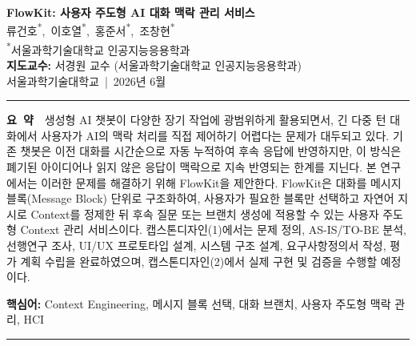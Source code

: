 \documentclass[10pt, a4paper]{article}
\begin{document}
\begin{center}
  {\large\bfseries FlowKit: 사용자 주도형 AI 대화 맥락 관리 서비스}\\[10pt]

  {\normalsize
    류건호\textsuperscript{*},\ 이호열\textsuperscript{*},\ 홍준서\textsuperscript{*},\ 조창현\textsuperscript{*}
  }\\[4pt]

  {\small
    \textsuperscript{*}서울과학기술대학교 인공지능응용학과\\[4pt]
    \textbf{지도교수:} 서경원 교수 (서울과학기술대학교 인공지능응용학과)\\[2pt]
    서울과학기술대학교\ |\ 2026년 6월
  }
\end{center}

\vspace{4pt}\hrule\vspace{6pt}

\noindent\textbf{요\ 약}\ \ 생성형 AI 챗봇이 다양한 장기 작업에 광범위하게 활용되면서, 긴 다중 턴 대화에서 사용자가
AI의 맥락 처리를 직접 제어하기 어렵다는 문제가 대두되고 있다. 기존 챗봇은 이전 대화를 시간순으로 자동 누적하여
후속 응답에 반영하지만, 이 방식은 폐기된 아이디어나 읽지 않은 응답이 맥락으로 지속 반영되는 한계를 지닌다. 본
연구에서는 이러한 문제를 해결하기 위해 FlowKit을 제안한다. FlowKit은 대화를 메시지 블록(Message Block) 단위로
구조화하여, 사용자가 필요한 블록만 선택하고 자연어 지시로 Context를 정제한 뒤 후속 질문 또는 브랜치 생성에 적용할
수 있는 사용자 주도형 Context 관리 서비스이다. 캡스톤디자인(1)에서는 문제 정의, AS-IS/TO-BE 분석, 선행연구 조사,
UI/UX 프로토타입 설계, 시스템 구조 설계, 요구사항정의서 작성, 평가 계획 수립을 완료하였으며, 캡스톤디자인(2)에서
실제 구현 및 검증을 수행할 예정이다.

\vspace{4pt}
\noindent\textbf{핵심어:} Context Engineering, 메시지 블록 선택, 대화 브랜치, 사용자 주도형 맥락 관리, HCI

\vspace{6pt}\hrule\vspace{8pt}
\end{document}
